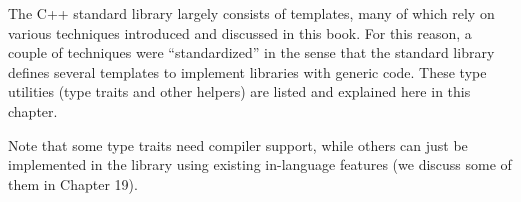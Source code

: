 The C++ standard library largely consists of templates, many of which rely on various techniques introduced and discussed in this book. For this reason, a couple of techniques were “standardized” in the sense that the standard library defines several templates to implement libraries with generic code. These type utilities (type traits and other helpers) are listed and explained here in this chapter.

Note that some type traits need compiler support, while others can just be implemented in the library using existing in-language features (we discuss some of them in Chapter 19).